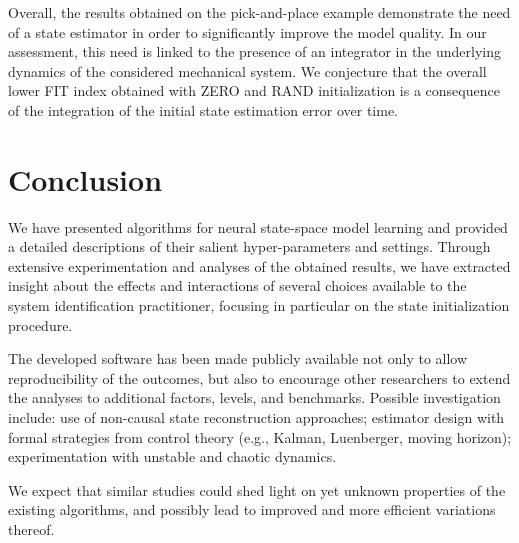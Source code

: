 \documentclass{article}
\begin{document}
Overall, the results obtained on the pick-and-place example demonstrate the need of a state estimator in order to significantly improve the model quality. In our assessment, this need is linked to the presence of an integrator in the underlying dynamics of the considered mechanical system. We conjecture that the overall lower FIT index obtained with ZERO and RAND initialization is a consequence of the integration of the initial state estimation error over time.   


\section{Conclusion}
We have presented algorithms for neural state-space model learning and provided a detailed descriptions of their salient hyper-parameters and settings. Through extensive experimentation and analyses of the obtained results, we have extracted insight about the effects and interactions of several choices available to the system identification practitioner, focusing in particular on the state initialization procedure. 

The developed software has been made publicly available not only to allow reproducibility of the outcomes, but also to encourage other researchers to extend the analyses to additional factors, levels, and benchmarks. Possible investigation include: use of non-causal 
state reconstruction approaches; estimator design with formal strategies from control theory (e.g., Kalman, Luenberger, moving horizon); experimentation with unstable and chaotic dynamics.

We expect that similar studies could shed light on yet unknown properties of the existing algorithms, 
and possibly lead to improved and more efficient variations thereof.
 



\end{document}
